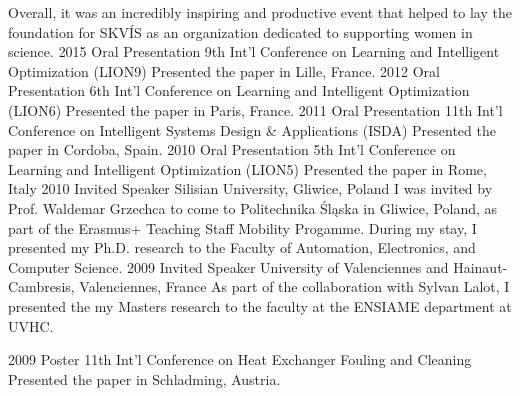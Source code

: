 \begin{entrylist}
{	Overall, it was an incredibly inspiring and productive event that helped to lay the foundation for SKVÍS as an organization dedicated to supporting women in science.
}
\entry
{2015}
{Oral Presentation}
{9th Int'l Conference on Learning and Intelligent Optimization (LION9)}
{Presented the paper  in Lille, France.}
\entry
{2012}
{Oral Presentation}
{6th Int'l Conference on Learning and Intelligent Optimization (LION6)}
{Presented the paper  in Paris,  France.}
\entry
{2011}
{Oral Presentation}
{11th Int'l Conference on Intelligent Systems Design \& Applications (ISDA)}
{Presented the paper   in Cordoba, Spain.}
\entry
{2010}
{Oral Presentation}
{5th Int'l Conference on Learning and Intelligent Optimization (LION5)}
{Presented the paper  in Rome, Italy}
\entry
{2010}
{Invited Speaker}
{Silisian University, Gliwice, Poland}
{I was invited by Prof. Waldemar Grzechca to come to Politechnika Śląska in Gliwice, Poland, as part of the Erasmus+ Teaching Staff Mobility Progamme. During my stay, I presented my Ph.D. research to the Faculty of Automation, Electronics, and Computer Science.}
\entry
{2009}
{Invited Speaker}
{University of Valenciennes and Hainaut-Cambresis, Valenciennes, France}
{As part of the collaboration with Sylvan Lalot, I presented the my Masters research to the faculty at the ENSIAME department at UVHC.}
\end{entrylist}
\begin{entrylist}
\entry
{2009}
{Poster}
{11th Int'l Conference on Heat Exchanger Fouling and Cleaning}
{Presented the paper  in Schladming, Austria.}
\end{entrylist}
